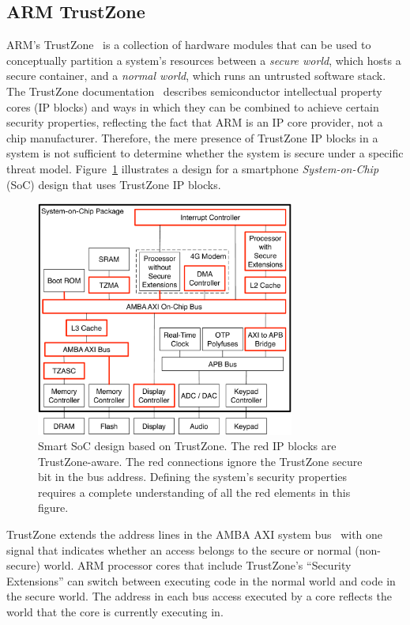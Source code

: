 \subsection{ARM TrustZone}

ARM's TrustZone~\cite{alves2004trustzone} is a collection of hardware modules
that can be used to conceptually partition a system's resources between a
\textit{secure world}, which hosts a secure container, and a \textit{normal
world}, which runs an untrusted software stack. The TrustZone
documentation~\cite{arm2009trustzone} describes semiconductor intellectual
property cores (IP blocks) and ways in which they can be combined to achieve
certain security properties, reflecting the fact that ARM is an IP core
provider, not a chip manufacturer. Therefore, the mere presence of TrustZone IP
blocks in a system is not sufficient to determine whether the system is secure
under a specific threat model. Figure~\ref{fig:trustzone} illustrates a design
for a smartphone \textit{System-on-Chip} (SoC) design that uses TrustZone IP
blocks.

\begin{figure}[hbt]
  \centering
  \includegraphics[width=85mm]{figures/trustzone.pdf}
  \caption{
    Smart SoC design based on TrustZone. The red IP blocks are TrustZone-aware.
    The red connections ignore the TrustZone secure bit in the bus address.
    Defining the system's security properties requires a complete understanding
    of all the red elements in this figure.
  }
  \label{fig:trustzone}
\end{figure}

TrustZone extends the address lines in the AMBA AXI system
bus~\cite{arm2004ambaxi} with one signal that indicates whether an access
belongs to the secure or normal (non-secure) world. ARM processor cores that
include TrustZone's ``Security Extensions'' can switch between executing code
in the normal world and code in the secure world. The address in each bus
access executed by a core reflects the world that the core is currently
executing in.

